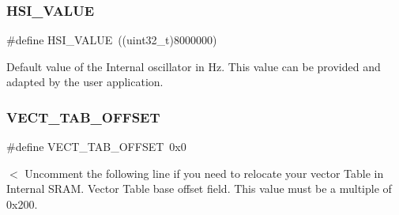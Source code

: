 \subsubsection{H\+S\+I\+\_\+\+V\+A\+L\+UE}
{\footnotesize\ttfamily \#define H\+S\+I\+\_\+\+V\+A\+L\+UE~((uint32\+\_\+t)8000000)}

Default value of the Internal oscillator in Hz. This value can be provided and adapted by the user application. \mbox{\label{group__STM32F3xx__System__Private__Defines_ga40e1495541cbb4acbe3f1819bd87a9fe}} 
\subsubsection{V\+E\+C\+T\+\_\+\+T\+A\+B\+\_\+\+O\+F\+F\+S\+ET}
{\footnotesize\ttfamily \#define V\+E\+C\+T\+\_\+\+T\+A\+B\+\_\+\+O\+F\+F\+S\+ET~0x0}

$<$ Uncomment the following line if you need to relocate your vector Table in Internal S\+R\+AM. Vector Table base offset field. This value must be a multiple of 0x200. 